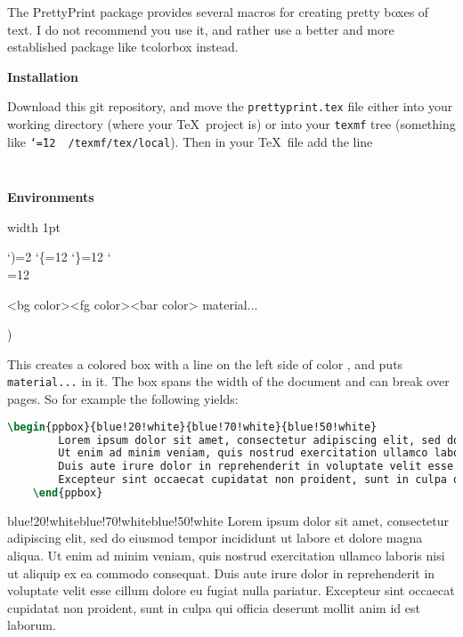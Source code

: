 \documentclass[10pt]{article}
\def\ppsection#1{\begin{blankpp} {\bfseries\Large #1} \end{blankpp}}
\def\showcase{\medskip\bgroup \color{showcasecolor} \leavevmode\vrule width 1pt \strut \aftergroup\medskip \catcode`)=2 \catcode`\{=12 \catcode`\}=12 \catcode`\\=12 \bftt\ \let\next=}
\begin{document}

\bigskip

The PrettyPrint package provides several macros for creating pretty boxes of text.
I do not recommend you use it, and rather use a better and more established package like tcolorbox instead.

\ppsection{Installation}

Download this git repository, and move the {\tt prettyprint.tex} file either into your working directory (where your \TeX\ 
project is) or into your {\tt texmf} tree (something like {\tt\catcode`\~=12 ~/texmf/tex/local}).
Then in your \TeX\ file add the line

\begin{lstlisting}[language=tex]
	
\end{lstlisting}

\ppsection{Environments}

\showcase(\begin{ppbox}{<bg color>}{<fg color>}{<bar color>} material... \end{ppbox})

This creates a colored box with a line on the left side of color {\tt <bar color>}, and puts {\tt material...} in it.
The box spans the width of the document and can break over pages.
So for example the following yields:

\begin{lstlisting}[language=tex]
	\begin{ppbox}{blue!20!white}{blue!70!white}{blue!50!white}
		Lorem ipsum dolor sit amet, consectetur adipiscing elit, sed do eiusmod tempor incididunt ut labore et dolore magna aliqua.
		Ut enim ad minim veniam, quis nostrud exercitation ullamco laboris nisi ut aliquip ex ea commodo consequat.
		Duis aute irure dolor in reprehenderit in voluptate velit esse cillum dolore eu fugiat nulla pariatur.
		Excepteur sint occaecat cupidatat non proident, sunt in culpa qui officia deserunt mollit anim id est laborum.
	\end{ppbox}
\end{lstlisting}

\begin{ppbox}{blue!20!white}{blue!70!white}{blue!50!white}
	Lorem ipsum dolor sit amet, consectetur adipiscing elit, sed do eiusmod tempor incididunt ut labore et dolore magna aliqua.
	Ut enim ad minim veniam, quis nostrud exercitation ullamco laboris nisi ut aliquip ex ea commodo consequat.
	Duis aute irure dolor in reprehenderit in voluptate velit esse cillum dolore eu fugiat nulla pariatur.
	Excepteur sint occaecat cupidatat non proident, sunt in culpa qui officia deserunt mollit anim id est laborum.
\end{ppbox}
\end{document}
